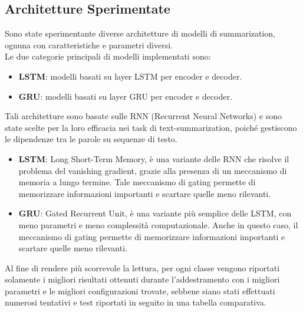 \subsection{Architetture Sperimentate}
Sono state sperimentante diverse architetture di modelli di summarization, ognuna con caratteristiche e parametri diversi.\\
Le due categorie principali di modelli implementati sono:
\begin{itemize}
    \item \textbf{LSTM}: modelli basati su layer LSTM per encoder e decoder.
    \item \textbf{GRU}: modelli basati su layer GRU per encoder e decoder.
\end{itemize}
Tali architetture sono basate sulle RNN (Recurrent Neural Networks) e sono state scelte per la loro efficacia nei task di text-summarization, poiché 
gestiscono le dipendenze tra le parole su sequenze di testo.\\ 
\begin{itemize}
    \item \textbf{LSTM}: Long Short-Term Memory, è una variante delle RNN che risolve il problema del vanishing gradient, grazie alla presenza di un meccanismo di memoria a lungo termine.
    Tale meccanismo di gating permette di memorizzare informazioni importanti e scartare quelle meno rilevanti.
    \item \textbf{GRU}: Gated Recurrent Unit, è una variante più semplice delle LSTM, con meno parametri e meno complessità computazionale.
    Anche in questo caso, il meccanismo di gating permette di memorizzare informazioni importanti e scartare quelle meno rilevanti.
\end{itemize}

Al fine di rendere più scorrevole la lettura, per ogni classe vengono riportati solamente i migliori risultati ottenuti durante l'addestramento con i migliori parametri e le migliori configurazioni trovate, sebbene
siano stati effettuati numerosi tentativi e test riportati in seguito in una tabella comparativa.\\






